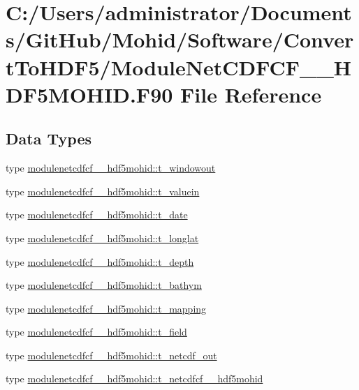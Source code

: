 \hypertarget{_module_net_c_d_f_c_f__2___h_d_f5_m_o_h_i_d_8_f90}{}\section{C\+:/\+Users/administrator/\+Documents/\+Git\+Hub/\+Mohid/\+Software/\+Convert\+To\+H\+D\+F5/\+Module\+Net\+C\+D\+F\+C\+F\+\_\+\_\+\+H\+D\+F5\+M\+O\+H\+ID.F90 File Reference}
\label{_module_net_c_d_f_c_f__2___h_d_f5_m_o_h_i_d_8_f90}
\subsection*{Data Types}
\begin{DoxyCompactItemize}
\item 
type \mbox{\hyperlink{structmodulenetcdfcf__2__hdf5mohid_1_1t__windowout}{modulenetcdfcf\+\_\+\_\+hdf5mohid\+::t\+\_\+windowout}}
\item 
type \mbox{\hyperlink{structmodulenetcdfcf__2__hdf5mohid_1_1t__valuein}{modulenetcdfcf\+\_\+\_\+hdf5mohid\+::t\+\_\+valuein}}
\item 
type \mbox{\hyperlink{structmodulenetcdfcf__2__hdf5mohid_1_1t__date}{modulenetcdfcf\+\_\+\_\+hdf5mohid\+::t\+\_\+date}}
\item 
type \mbox{\hyperlink{structmodulenetcdfcf__2__hdf5mohid_1_1t__longlat}{modulenetcdfcf\+\_\+\_\+hdf5mohid\+::t\+\_\+longlat}}
\item 
type \mbox{\hyperlink{structmodulenetcdfcf__2__hdf5mohid_1_1t__depth}{modulenetcdfcf\+\_\+\_\+hdf5mohid\+::t\+\_\+depth}}
\item 
type \mbox{\hyperlink{structmodulenetcdfcf__2__hdf5mohid_1_1t__bathym}{modulenetcdfcf\+\_\+\_\+hdf5mohid\+::t\+\_\+bathym}}
\item 
type \mbox{\hyperlink{structmodulenetcdfcf__2__hdf5mohid_1_1t__mapping}{modulenetcdfcf\+\_\+\_\+hdf5mohid\+::t\+\_\+mapping}}
\item 
type \mbox{\hyperlink{structmodulenetcdfcf__2__hdf5mohid_1_1t__field}{modulenetcdfcf\+\_\+\_\+hdf5mohid\+::t\+\_\+field}}
\item 
type \mbox{\hyperlink{structmodulenetcdfcf__2__hdf5mohid_1_1t__netcdf__out}{modulenetcdfcf\+\_\+\_\+hdf5mohid\+::t\+\_\+netcdf\+\_\+out}}
\item 
type \mbox{\hyperlink{structmodulenetcdfcf__2__hdf5mohid_1_1t__netcdfcf__2__hdf5mohid}{modulenetcdfcf\+\_\+\_\+hdf5mohid\+::t\+\_\+netcdfcf\+\_\+\_\+hdf5mohid}}
\end{DoxyCompactItemize}
